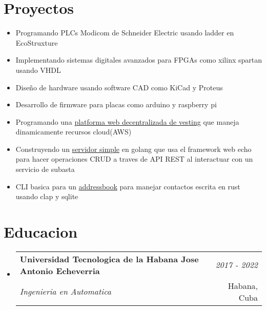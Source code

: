 \documentclass[a4paper,11pt]{article}
\makeatletter
\newcommand{\resumeSubheading}[4]{
\vspace{0.5mm}\item
    \begin{tabular*}{0.98\textwidth}[t]{l@{\extracolsep{\fill}}r}
        \textbf{#1} & \textit{\footnotesize{#4}} \\
        \textit{\footnotesize{#3}} &  \footnotesize{#2}\\
    \end{tabular*}
    \vspace{-2.4mm}
}
\newcommand{\resumeSubHeadingListStart}{\begin{itemize}[leftmargin=*,labelsep=1mm]}
\newcommand{\resumeItemListStart}{\begin{itemize}[leftmargin=*,labelsep=1mm,itemsep=0.5mm]}
\newcommand{\resumeSubHeadingListEnd}{\end{itemize}\vspace{2mm}}
\newcommand{\resumeItemListEnd}{\end{itemize}\vspace{-2mm}}
\makeatother
\begin{document}
\section{\textbf{Proyectos}}
\vspace{0.4mm}
\resumeItemListStart
    \vspace{0.8mm}
    \item Programando PLCs Modicom de Schneider Electric usando ladder en EcoStruxture
    \item Implementando sistemas digitales avanzados para FPGAs como xilinx spartan usando VHDL
    \item Diseño de hardware usando software CAD como KiCad y Proteus
    \item Desarrollo de firmware para placas como arduino y raspberry pi
    \item Programando una \href{https://vesting.cooltech.quest}{platforma web decentralizada de vesting} que maneja dinamicamente recursos cloud(AWS)
    \item Construyendo un \href{https://github.com/TheSnakeWitcher/AuctionHub-server}{servidor simple} en golang que usa el framework web echo para hacer
      operaciones CRUD a traves de API REST al interactuar con un servicio de subasta
    \item CLI basica para un \href{https://github.com/TheSnakeWitcher/mypeople}{addressbook} para manejar contactos escrita en rust usando clap y sqlite
\resumeItemListEnd


\section{\textbf{Educacion}}
\vspace{-0.4mm}
\resumeSubHeadingListStart
\resumeSubheading
{Universidad Tecnologica de la Habana Jose Antonio Echeverria}{Habana, Cuba}
{Ingenieria en Automatica}{2017 - 2022}
\resumeSubHeadingListEnd
\vspace{-6mm}
\end{document}
